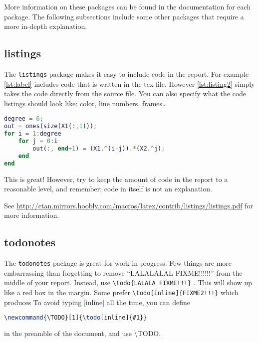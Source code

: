 More information on these packages can be found in the documentation for each package. The following subsections include some other packages that require a more in-depth explanation.

\subsection{listings}
The \texttt{listings} package makes it easy to include code in the report. For example \cref{lst:label} includes code that is written in the tex file. However \cref{lst:listing2} simply takes the code directly from the source file. You can also specify what the code listings should look like: color, line numbers, frames\ldots

\begin{lstlisting}[caption={Some Matlab code, with the source in the tex file},label={lst:label},language=Matlab, float]
degree = 6;
out = ones(size(X1(:,1)));
for i = 1:degree
    for j = 0:i
        out(:, end+1) = (X1.^(i-j)).*(X2.^j);
    end
end
\end{lstlisting}

This is great! However, try to keep the amount of code in the report to a reasonable level, and remember; code in itself is not an explanation.

See \url{http://ctan.mirrors.hoobly.com/macros/latex/contrib/listings/listings.pdf} for more information.

\subsection{todonotes}
The \texttt{todonotes} package is great for work in progress. Few things are more embarrassing than forgetting to remove ``LALALALAL FIXME!!!!!!'' from the middle of your report. Instead, use \texttt{\textbackslash todo\{LALALA FIXME!!!\}} . This will show up like a red box in the margin. Some prefer \texttt{\textbackslash todo{[inline]}\{FIXME2!!!\}} which produces  To avoid typing [inline] all the time, you can define
\begin{lstlisting}[language=TeX, numbers=none]
\newcommand{\TODO}[1]{\todo[inline]{#1}}
\end{lstlisting}

in the preamble of the document, and use \textbackslash TODO.

